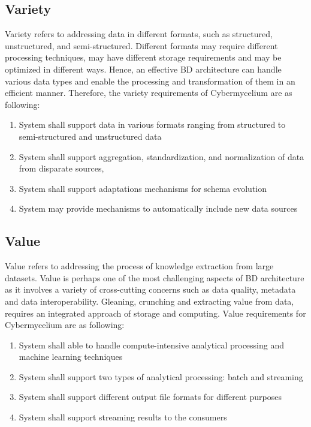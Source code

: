 \documentclass[review]{elsarticle}
\begin{document}
\subsection{Variety}

Variety refers to addressing data in different formats, such as structured, unstructured, and semi-structured. Different formats may require different processing techniques, may have different storage requirements and may be optimized in different ways. Hence, an effective BD architecture can handle various data types and enable the processing and transformation of them in an efficient manner. Therefore, the variety requirements of Cybermycelium are as following: 

\begin{enumerate}[label=\textbf{Var-\arabic*}]
    \item System shall support data in various formats ranging from structured to semi-structured and unstructured data
    \item System shall support aggregation, standardization, and normalization of data from disparate sources,
    \item System shall support adaptations mechanisms for schema evolution
    \item System may provide mechanisms to automatically include new data sources
\end{enumerate}


\subsection{Value}

Value refers to addressing the process of knowledge extraction from large datasets. Value is perhaps one of the most challenging aspects of BD architecture as it involves a variety of cross-cutting concerns such as data quality, metadata and data interoperability. Gleaning, crunching and extracting value from data, requires an integrated approach of storage and computing. Value requirements for Cybermycelium are as following:

\begin{enumerate}[label=\textbf{Val-\arabic*}]
    \item System shall able to handle compute-intensive analytical processing and machine learning techniques
    \item System shall support two types of analytical processing: batch and streaming
    \item System shall support different output file formats for different purposes
    \item System shall support streaming results to the consumers 
\end{enumerate}
\end{document}
